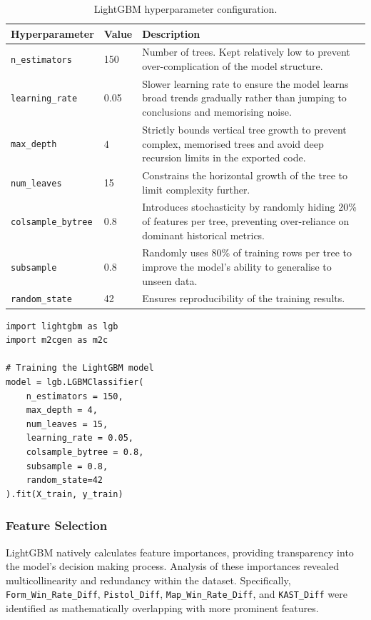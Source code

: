 \begin{table}[H]
    \centering
    \small
    \begin{tabularx}{\textwidth}{@{} l l >{\raggedright\arraybackslash}X @{}}
        \toprule
        \textbf{Hyperparameter} & \textbf{Value} & \textbf{Description} \\
        \midrule
        \texttt{n\_estimators} & 150 & Number of trees. Kept relatively low to prevent over-complication of the model structure. \\
        \midrule
        \texttt{learning\_rate} & 0.05 & Slower learning rate to ensure the model learns broad trends gradually rather than jumping to conclusions and memorising noise. \\
        \midrule
        \texttt{max\_depth} & 4 & Strictly bounds vertical tree growth to prevent complex, memorised trees and avoid deep recursion limits in the exported code. \\
        \midrule
        \texttt{num\_leaves} & 15 & Constrains the horizontal growth of the tree to limit complexity further. \\
        \midrule
        \texttt{colsample\_bytree} & 0.8 & Introduces stochasticity by randomly hiding 20\% of features per tree, preventing over-reliance on dominant historical metrics. \\
        \midrule
        \texttt{subsample} & 0.8 & Randomly uses 80\% of training rows per tree to improve the model's ability to generalise to unseen data. \\
        \midrule
        \texttt{random\_state} & 42 & Ensures reproducibility of the training results. \\
        \bottomrule
    \end{tabularx}
    \caption{LightGBM hyperparameter configuration.}
    \label{tab:lightgbm_hyperparameters}
\end{table}

\begin{lstlisting}[style=code, label={lst:lightGBMCode}, caption={Training the final LightGBM model and exporting it to Python using m2cgen.}]
import lightgbm as lgb
import m2cgen as m2c

# Training the LightGBM model
model = lgb.LGBMClassifier(
    n_estimators = 150,
    max_depth = 4,
    num_leaves = 15,
    learning_rate = 0.05,
    colsample_bytree = 0.8,
    subsample = 0.8,
    random_state=42
).fit(X_train, y_train)
\end{lstlisting}

\subsubsection{Feature Selection}
LightGBM natively calculates feature importances, providing transparency into the model's decision making process. Analysis of these importances revealed multicollinearity and redundancy within the dataset. Specifically, \texttt{Form\_Win\_Rate\_Diff}, \texttt{Pistol\_Diff}, \texttt{Map\_Win\_Rat\-e\_Diff}, and \texttt{KAST\_Diff} were identified as mathematically overlapping with more prominent features. 


